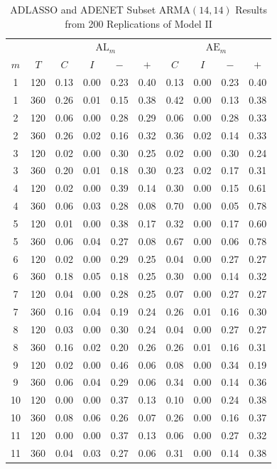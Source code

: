 \begin{table}[htbp]
\footnotesize
\centering
\caption{ADLASSO and ADENET Subset ARMA$(14,14)$ Results from 200 Replications of Model II}
\begin{tabular}{cc|cccc|cccc}
  \hline
    & & \multicolumn{4}{c|}{$\textrm{AL}_m$} & \multicolumn{4}{c}{$\textrm{AE}_m$} \\
  \cline{4-5}  \cline{8-9}  
  $m$ & $T$ & $C$ & $I$ & $-$ & $+$ & $C$ & $I$ & $-$ & $+$ \\
  \hline
  1 & 120 & 0.13 & 0.00 & 0.23 & 0.40 & 0.13 & 0.00 & 0.23 & 0.40 \\ 
  1 & 360 & 0.26 & 0.01 & 0.15 & 0.38 & 0.42 & 0.00 & 0.13 & 0.38 \\ 
  2 & 120 & 0.06 & 0.00 & 0.28 & 0.29 & 0.06 & 0.00 & 0.28 & 0.33 \\ 
  2 & 360 & 0.26 & 0.02 & 0.16 & 0.32 & 0.36 & 0.02 & 0.14 & 0.33 \\ 
  3 & 120 & 0.02 & 0.00 & 0.30 & 0.25 & 0.02 & 0.00 & 0.30 & 0.24 \\ 
  3 & 360 & 0.20 & 0.01 & 0.18 & 0.30 & 0.23 & 0.02 & 0.17 & 0.31 \\ 
  \hline
  4 & 120 & 0.02 & 0.00 & 0.39 & 0.14 & 0.30 & 0.00 & 0.15 & 0.61 \\ 
  4 & 360 & 0.06 & 0.03 & 0.28 & 0.08 & 0.70 & 0.00 & 0.05 & 0.78 \\ 
  5 & 120 & 0.01 & 0.00 & 0.38 & 0.17 & 0.32 & 0.00 & 0.17 & 0.60 \\ 
  5 & 360 & 0.06 & 0.04 & 0.27 & 0.08 & 0.67 & 0.00 & 0.06 & 0.78 \\
  \hline
  6 & 120 & 0.02 & 0.00 & 0.29 & 0.25 & 0.04 & 0.00 & 0.27 & 0.27 \\ 
  6 & 360 & 0.18 & 0.05 & 0.18 & 0.25 & 0.30 & 0.00 & 0.14 & 0.32 \\ 
  7 & 120 & 0.04 & 0.00 & 0.28 & 0.25 & 0.07 & 0.00 & 0.27 & 0.27 \\ 
  7 & 360 & 0.16 & 0.04 & 0.19 & 0.24 & 0.26 & 0.01 & 0.16 & 0.30 \\ 
  8 & 120 & 0.03 & 0.00 & 0.30 & 0.24 & 0.04 & 0.00 & 0.27 & 0.27 \\ 
  8 & 360 & 0.16 & 0.02 & 0.20 & 0.26 & 0.26 & 0.01 & 0.16 & 0.31 \\ 
  \hline
  9 & 120 & 0.02 & 0.00 & 0.46 & 0.06 & 0.08 & 0.00 & 0.34 & 0.19 \\ 
  9 & 360 & 0.06 & 0.04 & 0.29 & 0.06 & 0.34 & 0.00 & 0.14 & 0.36 \\ 
  10 & 120 & 0.00 & 0.00 & 0.37 & 0.13 & 0.10 & 0.00 & 0.24 & 0.38 \\ 
  10 & 360 & 0.08 & 0.06 & 0.26 & 0.07 & 0.26 & 0.00 & 0.16 & 0.37 \\ 
  11 & 120 & 0.00 & 0.00 & 0.37 & 0.13 & 0.06 & 0.00 & 0.27 & 0.32 \\ 
  11 & 360 & 0.04 & 0.03 & 0.27 & 0.06 & 0.31 & 0.00 & 0.14 & 0.38 \\ 
   \hline
\end{tabular}
\label{tab:alaemod2}
\end{table}

